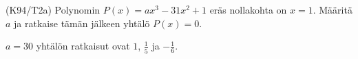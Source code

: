 \begin{tehtavasivu}
\begin{tehtava} %
(K94/T2a) Polynomin $P(x)=ax^3-31x^2+1$ eräs nollakohta on $x=1$. Määritä $a$ ja ratkaise tämän jälkeen yhtälö $P(x)=0$.
\begin{vastaus}
      $a=30$ yhtälön ratkaisut ovat $1$, $\frac{1}{5}$ ja $-\frac{1}{6}$.
    \end{vastaus}
\end{tehtava}

\end{tehtavasivu}
